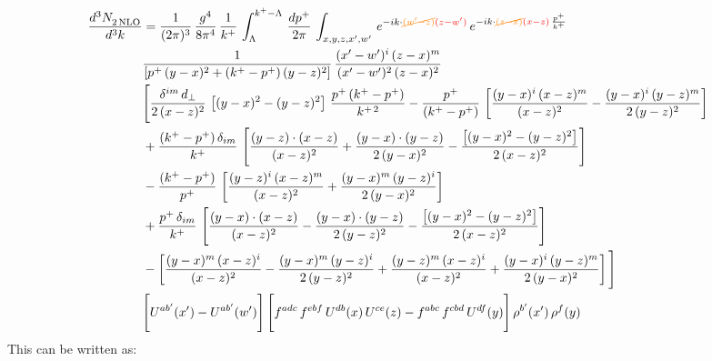 \documentclass[9pt]{article}
\numberwithin{equation}{section}
\begin{document}
\begin{align}
    \frac{d^{3}N_{2\,\rm NLO}^{\rm}}{d^{3}k}  & =  \frac{1}{(2\pi)^{3}}\,\frac{g^{4}}{8\pi^{4}}\,\frac{1}{k^{+}}\,\int_{\Lambda}^{k^{+}-\Lambda}\, \frac{dp^{+}}{2\pi} \,\int_{x,y,z,x',w'}\,e^{-ik\cdot{\color{orange}\cancel{(w'-z)}}{\color{red}(z-w')}}\,e^{-ik\cdot {\color{orange}\cancel{(z-x)}}{\color{red}(x-z)}\,\frac{p^{+}}{k^{+}}}\,\notag \\ & \frac{1}{\left[p^{+}\,(y-x)^{2}+(k^{+}-p^{+})\,(y-z)^{2}\right]}\, \frac{(x'-w')^{i}\,(z-x)^{m}}{(x'-w')^{2}\,(z-x)^{2}} \notag \\ & \Bigg[\frac{\delta^{im}\,d_{\perp}}{2\,(x-z)^{2}}\,\left[(y-x)^{2}-(y-z)^{2}\right]\,\frac{p^{+}\,(k^{+}-p^{+})}{k^{+\,2}}-\frac{p^{+}}{(k^{+}-p^{+})}\,\left[\frac{(y-x)^{i}\,(x-z)^{m}}{(x-z)^{2}}-\frac{(y-x)^{i}\,(y-z)^{m}}{2\,(y-z)^{2}}\right]\notag \\ & +\frac{(k^{+}-p^{+})\,\delta_{im}}{k^{+}}\,\left[\frac{(y-z)\cdot (x-z)}{(x-z)^{2}}+\frac{(y-x)\cdot (y-z)}{2\,(y-x)^{2}}-\frac{\left[(y-x)^{2}-(y-z)^{2}\right]}{2\,(x-z)^{2}}\right]\notag \\ & -\frac{(k^{+}-p^{+})}{p^{+}}\,\left[\frac{(y-z)^{i}\,(x-z)^{m}}{(x-z)^{2}}+\frac{(y-x)^{m}\,(y-z)^{i}}{2\,(y-x)^{2}}\right]\notag \\ & +\frac{p^{+}\,\delta_{im}}{k^{+}}\,\left[\frac{(y-x)\cdot (x-z)}{(x-z)^{2}}-\frac{(y-x)\cdot (y-z)}{2\,(y-z)^{2}}-\frac{\left[(y-x)^{2}-(y-z)^{2}\right]}{2\,(x-z)^{2}}\right]\notag \\ &-\left[\frac{(y-x)^{m}\,(x-z)^{i}}{(x-z)^{2}}-\frac{(y-x)^{m}\,(y-z)^{i}}{2\,(y-z)^{2}}+\frac{(y-z)^{m}\,(x-z)^{i}}{(x-z)^{2}}+\frac{(y-x)^{i}\,(y-z)^{m}}{2\,(y-x)^{2}}\right]\Bigg] \notag \\ & \Bigg[U^{ab'}(x')-U^{ab'}(w')\Bigg]\,\Bigg[f^{adc}\,f^{ebf}\,U^{db}(x)\,U^{ce}(z)-f^{abc}\,f^{cbd}\,U^{df}(y)\Bigg]\,\rho^{b'}(x')\,\rho^{f}(y)
\end{align}
This can be written as: 
\end{document}
